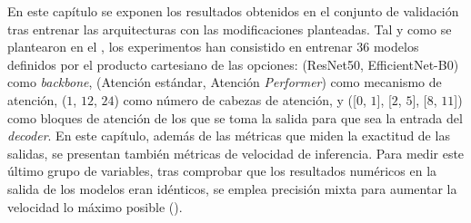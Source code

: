 


En este capítulo se exponen los resultados obtenidos en el conjunto de validación tras entrenar las arquitecturas con las modificaciones planteadas. Tal y como se plantearon en el , los experimentos han consistido en entrenar $36$ modelos definidos por el producto cartesiano de las opciones: (ResNet50, EfficientNet-B0) como \textit{backbone}, (Atención estándar, Atención \textit{Performer}) como mecanismo de atención, ($1$, $12$, $24$) como número de cabezas de atención, y ([$0$, $1$], [$2$, $5$], [$8$, $11$]) como bloques de atención de los que se toma la salida para que sea la entrada del \textit{decoder}. En este capítulo, además de las métricas que miden la exactitud de las salidas, se presentan también métricas de velocidad de inferencia. Para medir este último grupo de variables, tras comprobar que los resultados numéricos en la salida de los modelos eran idénticos, se emplea precisión mixta para aumentar la velocidad lo máximo posible ().

